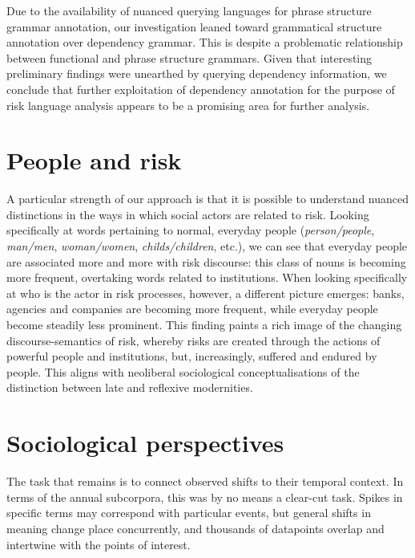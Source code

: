 Due to the availability of nuanced querying languages for phrase structure grammar annotation, our investigation leaned toward grammatical structure annotation over dependency grammar. This is despite a problematic relationship between functional and phrase structure grammars. Given that interesting preliminary findings were unearthed by querying dependency information, we conclude that further exploitation of dependency annotation for the purpose of risk language analysis appears to be a promising area for further analysis.

\section{People and risk}

A particular strength of our approach is that it is possible to understand nuanced distinctions in the ways in which social actors are related to risk. Looking specifically at words pertaining to normal, everyday people (\emph{person\slash people}, \emph{man\slash men}, \emph{woman\slash women}, \emph{childs\slash children}, etc.), we can see that everyday people are associated more and more with risk discourse: this class of nouns is becoming more frequent, overtaking words related to institutions. When looking specifically at who is the actor in risk processes, however, a different picture emerges: banks, agencies and companies are becoming more frequent, while everyday people become steadily less prominent. This finding paints a rich image of the changing discourse-semantics of risk, whereby risks are created through the actions of powerful people and institutions, but, increasingly, suffered and endured by people. This aligns with neoliberal sociological conceptualisations of the distinction between late and reflexive modernities.

\section{Sociological perspectives}

The task that remains is to connect observed shifts to their temporal context. In terms of the annual subcorpora, this was by no means a clear-cut task. Spikes in specific terms may correspond with particular events, but general shifts in meaning change place concurrently, and thousands of datapoints overlap and intertwine with the points of interest.

